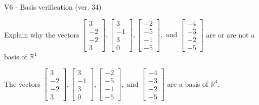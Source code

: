 \begin{exercise}
  \begin{exerciseTitle}V6 - Basis verification (ver. 34)\end{exerciseTitle}
  \begin{exerciseStatement}
    Explain why the vectors \(\left[\begin{array}{r}
3 \\
-2 \\
-2 \\
3
\end{array}\right] , \left[\begin{array}{r}
3 \\
-1 \\
3 \\
0
\end{array}\right] , \left[\begin{array}{r}
-2 \\
-5 \\
-1 \\
-5
\end{array}\right] , \text{ and } \left[\begin{array}{r}
-4 \\
-3 \\
-2 \\
-5
\end{array}\right]\) are or are not a basis of \(\mathbb{R}^4\)	


  \end{exerciseStatement}
  \begin{exerciseAnswer}
   The vectors \(\left[\begin{array}{r}
3 \\
-2 \\
-2 \\
3
\end{array}\right] , \left[\begin{array}{r}
3 \\
-1 \\
3 \\
0
\end{array}\right] , \left[\begin{array}{r}
-2 \\
-5 \\
-1 \\
-5
\end{array}\right] , \text{ and } \left[\begin{array}{r}
-4 \\
-3 \\
-2 \\
-5
\end{array}\right]\) 
  	 are  a basis of \(\mathbb{R}^4\).
  


  \end{exerciseAnswer}
\end{exercise}